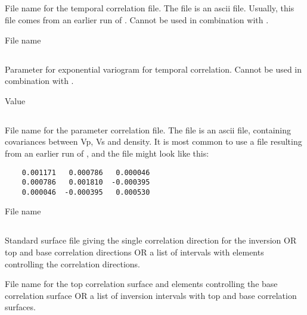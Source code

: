 \subsection{}
 \slist
   \item \Description File name for the temporal correlation file. The file is an ascii file. Usually, this file comes from an earlier run of \crava. Cannot be used in combination with .
   \item \Argument File name
   \item \Default
 \elist
 
 \subsection{}
  \slist
    \item \Description Parameter for exponential variogram for temporal correlation. Cannot be used in combination with .
    \item \Argument Value
    \item \Default
 \elist

\subsection{}
 \slist
   \item \Description File name for the parameter correlation file. The file is an ascii file, containing covariances between Vp, Vs and density.
   It is most common to use a file resulting from an earlier run of \crava, and the file might look like this:

  \begin{verbatim}
    0.001171   0.000786   0.000046
  	0.000786   0.001810  -0.000395
  	0.000046  -0.000395   0.000530
  \end{verbatim}
   \item \Argument File name
   \item \Default
 \elist

\subsection{}
 \slist
   \item \Description Standard surface file giving the single correlation direction for the inversion OR top and base correlation directions OR a list of intervals with elements controlling the correlation directions.
   \item \Argument File name for the top correlation surface and elements controlling the base correlation surface OR a list of inversion intervals with top and base correlation surfaces.
   \item \Default
 \elist

